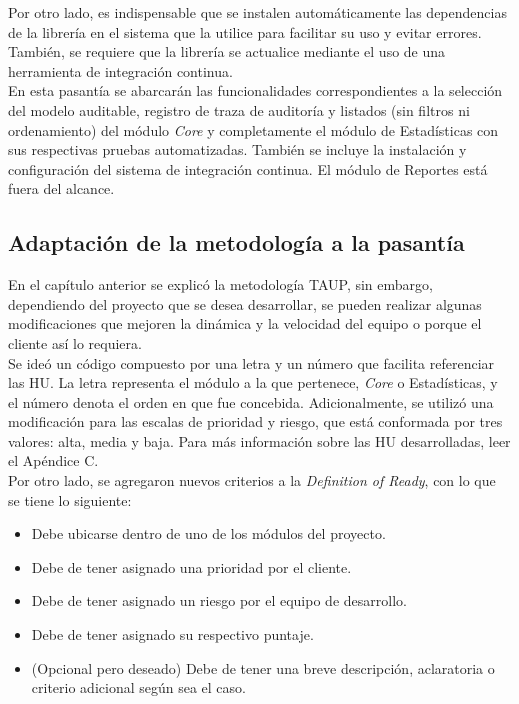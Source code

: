 Por otro lado, es indispensable que se instalen automáticamente las dependencias de la librería en el sistema que la utilice para facilitar su uso y evitar errores. También, se requiere que la librería se actualice mediante el uso de una herramienta de integración continua. \\

En esta pasantía se abarcarán las funcionalidades correspondientes a la selección del modelo auditable, registro de traza de auditoría y listados (sin filtros ni ordenamiento) del módulo \textit{Core} y completamente el módulo de Estadísticas con sus respectivas pruebas automatizadas. También se incluye la instalación y configuración del sistema de integración continua. El módulo de Reportes está fuera del alcance.

\subsection{Adaptación de la metodología a la pasantía}

En el capítulo anterior se explicó la metodología TAUP, sin embargo, dependiendo del proyecto que se desea desarrollar, se pueden realizar algunas modificaciones que mejoren la dinámica y la velocidad del equipo o porque el cliente así lo requiera.\\

Se ideó un código compuesto por una letra y un número que facilita referenciar las HU. La letra representa el módulo a la que pertenece, \textit{Core} o Estadísticas, y el número denota el orden en que fue concebida. Adicionalmente, se utilizó una modificación  para las escalas de prioridad y riesgo, que está conformada por tres valores: alta, media y baja. Para más información sobre las HU desarrolladas, leer el Apéndice C.\\

Por otro lado, se agregaron nuevos criterios a la \textit{Definition of Ready}, con lo que se tiene lo siguiente:

\begin{itemize}
    \item Debe ubicarse dentro de uno de los módulos del proyecto.
    \item Debe de tener asignado una prioridad por el cliente.
    \item Debe de tener asignado un riesgo por el equipo de desarrollo.
    \item Debe de tener asignado su respectivo puntaje.
    \item (Opcional pero deseado) Debe de tener una breve descripción, aclaratoria o criterio adicional según sea el caso.
\end{itemize}

